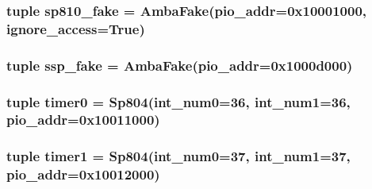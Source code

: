 \label{classRealView_1_1RealViewPBX_ae5f924bae96d172d477be2bfc6df2004}
\hypertarget{classRealView_1_1RealViewPBX_a42d6450a02aa42b77cd21f39eb6a3fbb}{
\subsubsection[{sp810\_\-fake}]{\setlength{\rightskip}{0pt plus 5cm}tuple {\bf sp810\_\-fake} = {\bf AmbaFake}(pio\_\-addr=0x10001000, ignore\_\-access=True)}}
\label{classRealView_1_1RealViewPBX_a42d6450a02aa42b77cd21f39eb6a3fbb}
\hypertarget{classRealView_1_1RealViewPBX_a663792173a35cbb5279a335c3cda0e15}{
\subsubsection[{ssp\_\-fake}]{\setlength{\rightskip}{0pt plus 5cm}tuple {\bf ssp\_\-fake} = {\bf AmbaFake}(pio\_\-addr=0x1000d000)}}
\label{classRealView_1_1RealViewPBX_a663792173a35cbb5279a335c3cda0e15}
\hypertarget{classRealView_1_1RealViewPBX_af4ebf9ec12f4c51e9fd2eee3647a3932}{
\subsubsection[{timer0}]{\setlength{\rightskip}{0pt plus 5cm}tuple {\bf timer0} = {\bf Sp804}(int\_\-num0=36, int\_\-num1=36, pio\_\-addr=0x10011000)}}
\label{classRealView_1_1RealViewPBX_af4ebf9ec12f4c51e9fd2eee3647a3932}
\hypertarget{classRealView_1_1RealViewPBX_a43a269dacabf237422bf29f79e52a7e5}{
\subsubsection[{timer1}]{\setlength{\rightskip}{0pt plus 5cm}tuple {\bf timer1} = {\bf Sp804}(int\_\-num0=37, int\_\-num1=37, pio\_\-addr=0x10012000)}}
